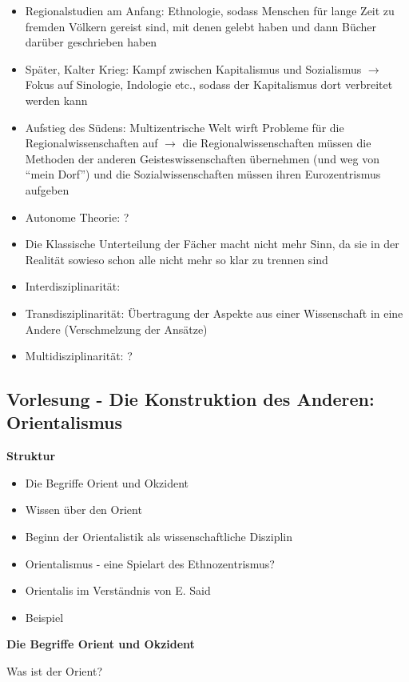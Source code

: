 \documentclass[emulatestandardclasses]{scrartcl}
\begin{document}
\begin{itemize}
  \item Regionalstudien am Anfang: Ethnologie, sodass Menschen für lange Zeit zu fremden Völkern gereist sind, mit denen gelebt haben und dann Bücher darüber geschrieben haben
  \item Später, Kalter Krieg: Kampf zwischen Kapitalismus und Sozialismus $\rightarrow$ Fokus auf Sinologie, Indologie etc., sodass der Kapitalismus dort verbreitet werden kann
  \item Aufstieg des Südens: Multizentrische Welt wirft Probleme für die Regionalwissenschaften auf $\rightarrow$ die Regionalwissenschaften müssen die Methoden der anderen Geisteswissenschaften übernehmen (und weg von "`mein Dorf"') und die Sozialwissenschaften müssen ihren Eurozentrismus aufgeben
  \item Autonome Theorie: ?
  \item Die Klassische Unterteilung der Fächer macht nicht mehr Sinn, da sie in der Realität sowieso schon alle nicht mehr so klar zu trennen sind
  \item Interdisziplinarität:
  \item Transdisziplinarität: Übertragung der Aspekte aus einer Wissenschaft in eine Andere (Verschmelzung der Ansätze)
  \item Multidisziplinarität: ?
\end{itemize}

\subsection{Vorlesung - Die Konstruktion des Anderen: Orientalismus}


\textbf{Struktur}

\begin{itemize}
  \item Die Begriffe Orient und Okzident
  \item Wissen über den Orient
  \item Beginn der Orientalistik als wissenschaftliche Disziplin
  \item Orientalismus - eine Spielart des Ethnozentrismus?
  \item Orientalis im Verständnis von E. Said
  \item Beispiel
\end{itemize}

\textbf{Die Begriffe Orient und Okzident}

Was ist der Orient?
\end{document}

